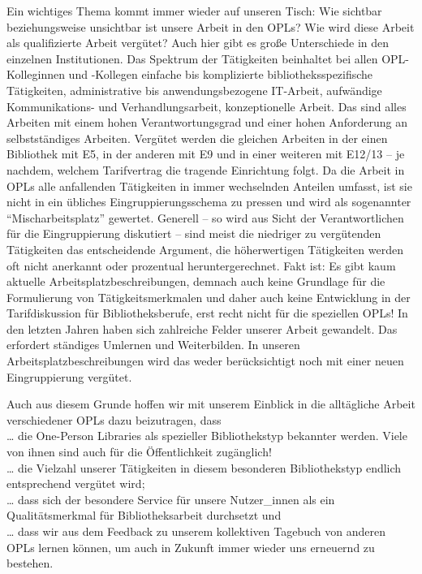 \documentclass[a4paper,
fontsize=11pt,
oneside,
numbers=noperiodatend,
parskip=half-,
bibliography=totoc,
final
]{scrartcl}
\begin{document}
Ein wichtiges Thema kommt immer wieder auf unseren Tisch: Wie sichtbar
beziehungsweise unsichtbar ist unsere Arbeit in den OPLs? Wie wird diese
Arbeit als qualifizierte Arbeit vergütet? Auch hier gibt es große
Unterschiede in den einzelnen Institutionen. Das Spektrum der
Tätigkeiten beinhaltet bei allen OPL-Kolleginnen und -Kollegen einfache
bis komplizierte bibliotheksspezifische Tätigkeiten, administrative bis
anwendungsbezogene IT-Arbeit, aufwändige Kommunikations- und
Verhandlungsarbeit, konzeptionelle Arbeit. Das sind alles Arbeiten mit
einem hohen Verantwortungsgrad und einer hohen Anforderung an
selbstständiges Arbeiten. Vergütet werden die gleichen Arbeiten in der
einen Bibliothek mit E5, in der anderen mit E9 und in einer weiteren mit
E12/13 -- je nachdem, welchem Tarifvertrag die tragende Einrichtung
folgt. Da die Arbeit in OPLs alle anfallenden Tätigkeiten in immer
wechselnden Anteilen umfasst, ist sie nicht in ein übliches
Eingruppierungsschema zu pressen und wird als sogenannter
\enquote{Mischarbeitsplatz} gewertet. Generell -- so wird aus Sicht der
Verantwortlichen für die Eingruppierung diskutiert -- sind meist die
niedriger zu vergütenden Tätigkeiten das entscheidende Argument, die
höherwertigen Tätigkeiten werden oft nicht anerkannt oder prozentual
heruntergerechnet. Fakt ist: Es gibt kaum aktuelle
Arbeitsplatzbeschreibungen, demnach auch keine Grundlage für die
Formulierung von Tätigkeitsmerkmalen und daher auch keine Entwicklung in
der Tarifdiskussion für Bibliotheksberufe, erst recht nicht für die
speziellen OPLs! In den letzten Jahren haben sich zahlreiche Felder
unserer Arbeit gewandelt. Das erfordert ständiges Umlernen und
Weiterbilden. In unseren Arbeitsplatzbeschreibungen wird das weder
berücksichtigt noch mit einer neuen Eingruppierung vergütet.

Auch aus diesem Grunde hoffen wir mit unserem Einblick in die
alltägliche Arbeit verschiedener OPLs dazu beizutragen, dass\\

\ldots{} die One-Person Libraries als spezieller Bibliothekstyp
bekannter werden. Viele von ihnen sind auch für die Öffentlichkeit
zugänglich!\\
\ldots{} die Vielzahl unserer Tätigkeiten in diesem besonderen
Bibliothekstyp endlich entsprechend vergütet wird;\\
\ldots{} dass sich der besondere Service für unsere Nutzer\_innen als
ein Qualitätsmerkmal für Bibliotheksarbeit durchsetzt und\\
\ldots{} dass wir aus dem Feedback zu unserem kollektiven Tagebuch von
anderen OPLs lernen können, um auch in Zukunft immer wieder uns
erneuernd zu bestehen.
\end{document}
